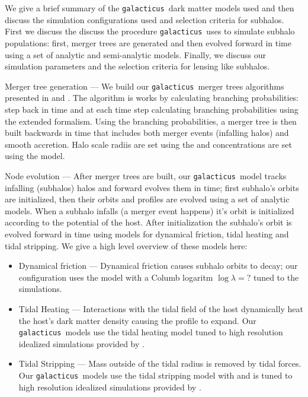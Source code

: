 \documentclass[%
 reprint,
 amsmath,
 amssymb,
 aps,
]{revtex4-2}
\def\gal{{\tt galacticus}~}
\begin{document}
We give a brief summary of the \gal dark matter models used and then discuss the simulation configurations used and selection criteria for subhalos. First we discuss the discuss the procedure \gal uses to simulate subhalo populations: first, merger trees are generated and then evolved forward in time using a set of analytic and semi-analytic models. Finally, we discuss our simulation parameters and the selection criteria for lensing like subhalos. 

Merger tree generation — We build our \gal merger trees algorithms presented in \citet{cole2000formation} and \citet{parkinson2008generating}. 
The algorithm is works by calculating branching probabilities: step back in time and at each time step calculating branching probabilities using the extended \citet{press1974formation} formalism. 
Using the branching probabilities, a merger tree is then built backwards in time that includes both merger events (infalling halos) and smooth accretion. Halo scale radiis are set using the \citet{ludlow2016mass} and concentrations are set using the \citet{diemer2019accurate} model.

Node evolution — After merger trees are built, our \gal model tracks infalling (subhalos) halos and forward evolves them in time; first subhalo's orbits are initialized, then their orbits and profiles are evolved using a set of analytic models. When a subhalo infalls (a merger event happens) it's orbit is initialized according to the potential of the host. After initialization the subhalo's orbit is evolved forward in time using models for dynamical friction, tidal heating and tidal stripping.  We give a high level overview of these models here: 
\begin{itemize}
    \item Dynamical friction — Dynamical friction causes subhalo orbits to decay; our configuration uses the \cite{chandrasekhar1943dynamical} model with a Columb logaritm $\log \lambda = ?$ tuned to the \citet{grilfen2016caterpillar} simulations. 
    \item Tidal Heating — Interactions with the tidal field of the host dynamically heat the host's dark matter density causing the profile to expand. Our \gal models use the \citet{gnedin1999tidal} tidal heating model tuned to high resolution idealized simulations provided by \citet{du2024tidal}.
    \item Tidal Stripping — Mass outside of the tidal radius is removed by tidal forces. Our \gal models use the \citet{zentner2005physics} tidal stripping model with and is tuned to high resolution idealized simulations provided by \citet{du2024tidal}.
\end{itemize}
\end{document}
